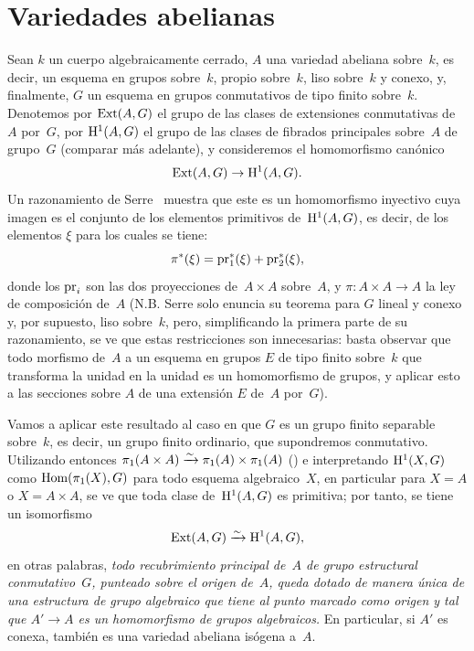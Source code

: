 \section{Variedades abelianas}
\label{XI.2}
Sean $k$ un cuerpo algebraicamente cerrado, $A$ una variedad abeliana
sobre~$k$, es decir, un esquema en grupos sobre~$k$, propio sobre~$k$,
liso sobre~$k$ y conexo, y, finalmente, $G$ un esquema en grupos conmutativos de tipo
finito sobre~$k$. Denotemos por $\operatorname{Ext}(A,G)$ el grupo de las clases de
extensiones conmutativas de~$A$ por~$G$, por $\mathrm H^1(A,G)$ el grupo de las
clases de fibrados principales sobre~$A$ de grupo~$G$ (comparar
\No {} más adelante), y consideremos el homomorfismo canónico
$$
\operatorname{Ext}(A,G)\to \mathrm H^1(A,G).
$$
Un
razonamiento de Serre~\cite[cap\ptbl VII, teor]{XI.5} muestra que
este es un homomorfismo inyectivo cuya imagen es el conjunto de los
\og elementos primitivos\fg{} de~$\mathrm H^1(A,G)$, es decir, de los elementos
$\xi$ para los cuales se tiene:
$$
\pi^*(\xi) = \mathrm{pr}_1^*(\xi) + \mathrm{pr}_2^*(\xi),
$$
donde los $\mathrm{pr}_i$ son las dos proyecciones de~$A\times A$ sobre~$A$, y
$\pi\colon A\times A\to A$ la ley de composición de~$A$ (N.B. Serre solo
enuncia su teorema para $G$ lineal y conexo y, por supuesto, liso sobre~$k$,
pero, simplificando la primera parte de su razonamiento, se ve que estas
restricciones son innecesarias: basta observar que todo morfismo de~$A$ a un
esquema en grupos $E$ de tipo finito sobre~$k$ que transforma la unidad en
la unidad es un homomorfismo de grupos, y aplicar esto a las secciones sobre
$A$ de una extensión $E$ de~$A$ por~$G$).

Vamos a aplicar este resultado al caso en que $G$ es un grupo finito
separable sobre~$k$, es decir, un grupo finito ordinario, que supondremos
conmutativo. Utilizando entonces
$\pi_1(A\times A)\xrightarrow{\sim}\allowbreak\pi_1(A)\times\pi_1(A)$
() e interpretando $\mathrm H^1(X,G)$ como
$\operatorname{Hom}(\pi_1(X),G)$ para todo esquema algebraico~$X$, en particular para
$X=A$ o $X=A\times A$, se ve que toda clase de~$\mathrm H^1(A,G)$ es primitiva;
por tanto, se tiene un isomorfismo
$$
\operatorname{Ext}(A,G)\xrightarrow{\sim} \mathrm H^1(A,G),
$$
en otras palabras, \emph{todo recubrimiento principal de~$A$ de grupo
estructural conmutativo~$G$, punteado sobre el origen de~$A$, queda dotado
de manera única de una estructura de grupo algebraico que tiene al punto
marcado como origen y tal que $A'\to A$ es un homomorfismo de grupos
algebraicos.} En particular, si $A'$ es conexa, también es una variedad
abeliana isógena a~$A$.

